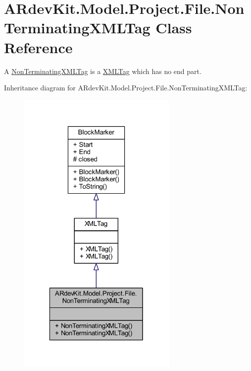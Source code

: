 \hypertarget{class_a_rdev_kit_1_1_model_1_1_project_1_1_file_1_1_non_terminating_x_m_l_tag}{\section{A\-Rdev\-Kit.\-Model.\-Project.\-File.\-Non\-Terminating\-X\-M\-L\-Tag Class Reference}
\label{class_a_rdev_kit_1_1_model_1_1_project_1_1_file_1_1_non_terminating_x_m_l_tag}
}


A \hyperlink{class_a_rdev_kit_1_1_model_1_1_project_1_1_file_1_1_non_terminating_x_m_l_tag}{Non\-Terminating\-X\-M\-L\-Tag} is a \hyperlink{class_a_rdev_kit_1_1_model_1_1_project_1_1_file_1_1_x_m_l_tag}{X\-M\-L\-Tag} which has no end part.  




Inheritance diagram for A\-Rdev\-Kit.\-Model.\-Project.\-File.\-Non\-Terminating\-X\-M\-L\-Tag\-:
\nopagebreak
\begin{figure}[H]
\begin{center}
\leavevmode
\includegraphics[width=220pt]{class_a_rdev_kit_1_1_model_1_1_project_1_1_file_1_1_non_terminating_x_m_l_tag__inherit__graph}
\end{center}
\end{figure}


